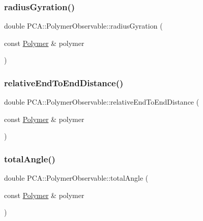 \subsubsection{\texorpdfstring{radius\+Gyration()}{radiusGyration()}}
{\footnotesize\ttfamily double P\+C\+A\+::\+Polymer\+Observable\+::radius\+Gyration (\begin{DoxyParamCaption}\item[{const \hyperlink{class_p_c_a_1_1_polymer}{Polymer} \&}]{polymer }\end{DoxyParamCaption})\hspace{0.3cm}{\ttfamily [static]}}

\hypertarget{class_p_c_a_1_1_polymer_observable_a72ff49d3aed6660b0bd7a8175f3b436e}{}\label{class_p_c_a_1_1_polymer_observable_a72ff49d3aed6660b0bd7a8175f3b436e} 
\subsubsection{\texorpdfstring{relative\+End\+To\+End\+Distance()}{relativeEndToEndDistance()}}
{\footnotesize\ttfamily double P\+C\+A\+::\+Polymer\+Observable\+::relative\+End\+To\+End\+Distance (\begin{DoxyParamCaption}\item[{const \hyperlink{class_p_c_a_1_1_polymer}{Polymer} \&}]{polymer }\end{DoxyParamCaption})\hspace{0.3cm}{\ttfamily [static]}}

\hypertarget{class_p_c_a_1_1_polymer_observable_ae5b2dbf1d87aa54347f2a66bfb24e78b}{}\label{class_p_c_a_1_1_polymer_observable_ae5b2dbf1d87aa54347f2a66bfb24e78b} 
\subsubsection{\texorpdfstring{total\+Angle()}{totalAngle()}}
{\footnotesize\ttfamily double P\+C\+A\+::\+Polymer\+Observable\+::total\+Angle (\begin{DoxyParamCaption}\item[{const \hyperlink{class_p_c_a_1_1_polymer}{Polymer} \&}]{polymer }\end{DoxyParamCaption})\hspace{0.3cm}{\ttfamily [static]}}

